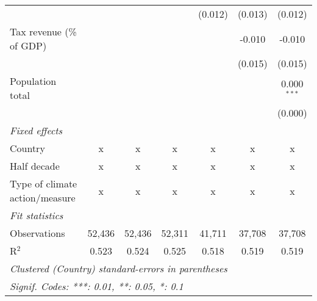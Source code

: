 \begin{tabular}{lcccccc}
                                                       &              &              &               & (0.012)        & (0.013)        & (0.012)\\   
   Tax revenue (\% of GDP)                             &              &              &               &                & -0.010         & -0.010\\   
                                                       &              &              &               &                & (0.015)        & (0.015)\\   
   Population total                                    &              &              &               &                &                & 0.000$^{***}$\\   
                                                       &              &              &               &                &                & (0.000)\\   
   \emph{Fixed effects}\\
   Country                                             & x            & x            & x             & x              & x              & x\\  
   Half decade                                         & x            & x            & x             & x              & x              & x\\  
   Type of climate action/measure                      & x            & x            & x             & x              & x              & x\\  
   \midrule \emph{Fit statistics}\\
   Observations                                        & 52,436       & 52,436       & 52,311        & 41,711         & 37,708         & 37,708\\  
   R$^2$                                               & 0.523        & 0.524        & 0.525         & 0.518          & 0.519          & 0.519\\  
   \midrule
   \multicolumn{7}{l}{\emph{Clustered (Country) standard-errors in parentheses}}\\
   \multicolumn{7}{l}{\emph{Signif. Codes: ***: 0.01, **: 0.05, *: 0.1}}\\
\end{tabular}
\par\endgroup


